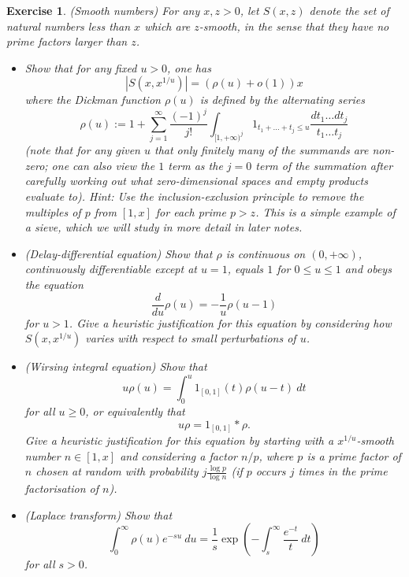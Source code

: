 \documentclass[10pt,reqno]{amsart}
\newtheorem{exercise}[theorem]{Exercise}
\begin{document}
\begin{exercise} (Smooth numbers)
    For any $x, z > 0$, let $S(x,z)$ denote the set of natural numbers less than $x$ which are $z$-smooth, in the sense that they have no prime factors larger than $z$.
    \begin{itemize}
        \item[(i)] Show that for any fixed $u > 0$, one has
        \[  |S(x, x^{1/u})| = (\rho(u) + o(1)) x\]
    where the \emph{Dickman function} $\rho(u)$ is defined by the alternating series
    \[  \rho(u) := 1 + \sum_{j=1}^\infty \frac{(-1)^j}{j!} \int_{[1,+\infty)^j} 1_{t_1+\dots+t_j \leq u} \frac{dt_1 \dots dt_j}{t_1 \dots t_j} \]
    (note that for any given $u$ that only finitely many of the summands are non-zero; one can also view the $1$ term as the $j=0$ term of the summation after carefully working out what zero-dimensional spaces and empty products evaluate to). Hint: Use the \emph{inclusion-exclusion principle} to remove the multiples of $p$ from $[1,x]$ for each prime $p > z$. This is a simple example of a \emph{sieve}, which we will study in more detail in later notes.

    \item[(ii)] (Delay-differential equation) Show that $\rho$ is continuous on $(0,+\infty)$, continuously differentiable except at $u=1$, equals $1$ for $0 \leq u \leq 1$ and obeys the equation
    \[  \frac{d}{du} \rho(u) = - \frac{1}{u} \rho(u-1) \]
    for $u > 1$. Give a heuristic justification for this equation by considering how $S(x,x^{1/u})$ varies with respect to small perturbations of $u$.

    \item[(iii)] (Wirsing integral equation) Show that
    \[  u \rho(u) = \int_0^u 1_{[0,1]}(t) \rho(u-t)\ dt\]
    for all $u \geq 0$, or equivalently that
    \[  u \rho = 1_{[0,1]} * \rho.\]
    Give a heuristic justification for this equation by starting with a $x^{1/u}$-smooth number $n \in [1,x]$ and considering a factor $n/p$, where $p$ is a prime factor of $n$ chosen at random with probability $j \frac{\log p}{\log n}$ (if $p$ occurs $j$ times in the prime factorisation of $n$).

    \item[(iv)] (Laplace transform) Show that
    \[  \int_0^\infty \rho(u) e^{-su}\ du = \frac{1}{s} \exp( - \int_s^\infty \frac{e^{-t}}{t}\ dt )\]
    for all $s > 0$.
\end{itemize}
\end{exercise}
\end{document}

